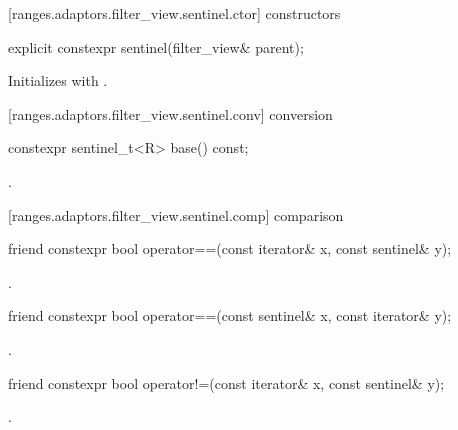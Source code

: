 [ranges.adaptors.filter_view.sentinel.ctor]{ constructors}

%
\begin{itemdecl}
explicit constexpr sentinel(filter_view& parent);
\end{itemdecl}

\begin{itemdescr}
\pnum
\effects Initializes  with .
\end{itemdescr}

[ranges.adaptors.filter_view.sentinel.conv]{ conversion}

%
\begin{itemdecl}
constexpr sentinel_t<R> base() const;
\end{itemdecl}

\begin{itemdescr}
\pnum
\returns {}.
\end{itemdescr}

[ranges.adaptors.filter_view.sentinel.comp]{ comparison}

%
\begin{itemdecl}
friend constexpr bool operator==(const iterator& x, const sentinel& y);
\end{itemdecl}

\begin{itemdescr}
\pnum
\returns {}.
\end{itemdescr}

%
\begin{itemdecl}
friend constexpr bool operator==(const sentinel& x, const iterator& y);
\end{itemdecl}

\begin{itemdescr}
\pnum
\returns {}.
\end{itemdescr}

%
\begin{itemdecl}
friend constexpr bool operator!=(const iterator& x, const sentinel& y);
\end{itemdecl}

\begin{itemdescr}
\pnum
\returns {}.
\end{itemdescr}

